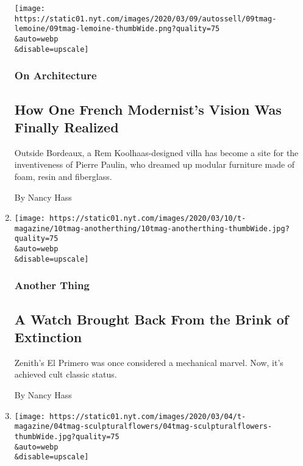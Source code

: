 \begin{enumerate}
  \texttt{[image: https://static01.nyt.com/images/2020/03/09/autossell/09tmag-lemoine/09tmag-lemoine-thumbWide.png?quality=75\\\&auto=webp\\\&disable=upscale]}

  \hypertarget{on-architecture}{%
  \subsubsection{On Architecture}\label{on-architecture}}

  \hypertarget{how-one-french-modernists-vision-was-finally-realized}{%
  \subsection{How One French Modernist's Vision Was Finally
  Realized}\label{how-one-french-modernists-vision-was-finally-realized}}

  Outside Bordeaux, a Rem Koolhaas-designed villa has become a site for
  the inventiveness of Pierre Paulin, who dreamed up modular furniture
  made of foam, resin and fiberglass.

  By Nancy Hass
\item
  \href{/2020/03/10/t-magazine/zenith-el-primero-watch.html}{}

  \texttt{[image: https://static01.nyt.com/images/2020/03/10/t-magazine/10tmag-anotherthing/10tmag-anotherthing-thumbWide.jpg?quality=75\\\&auto=webp\\\&disable=upscale]}

  \hypertarget{another-thing}{%
  \subsubsection{Another Thing}\label{another-thing}}

  \hypertarget{a-watch-brought-back-from-the-brink-of-extinction}{%
  \subsection{A Watch Brought Back From the Brink of
  Extinction}\label{a-watch-brought-back-from-the-brink-of-extinction}}

  Zenith's El Primero was once considered a mechanical marvel. Now, it's
  achieved cult classic status.

  By Nancy Hass
\item
  \href{/2020/03/04/t-magazine/flower-arrangements-sculptures.html}{}

  \texttt{[image: https://static01.nyt.com/images/2020/03/04/t-magazine/04tmag-sculpturalflowers/04tmag-sculpturalflowers-thumbWide.jpg?quality=75\\\&auto=webp\\\&disable=upscale]}


\end{enumerate}
